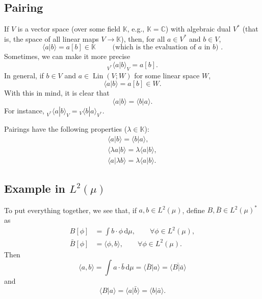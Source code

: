 \documentclass[a4paper,9pt]{amsart}
\newcommand{\bb}[1]{\mathbb{#1}}
\newcommand{\C}{\mathbb{C}}	%
\newcommand{\did}{\,\mathrm{d}}	%
\theoremstyle{plain}
\theoremstyle{definition}
\theoremstyle{remark}
\begin{document}
\subsection{Pairing}\label{subs6889e83c}
If $V$ is a vector space (over some field $\bb K$, e.g., $\bb K=\C$) with algebraic dual $V^*$ (that is, the space of all linear maps $V\to\bb K$), then,
for all $a\in V^*$ and $b\in V$,
\begin{equation}
	\langle a|b \rangle = a[b] \in \bb K \qquad\text{ (which is the evaluation of $a$ in $b$) .}
\end{equation}
Sometimes, we can make it more precise
\begin{equation}
	{}_{V^*}\langle a|b \rangle_V = a[b] .
\end{equation}
In general, if $b\in V$ and $a\in\operatorname{Lin}(V;W)$ for some linear space $W$,
\begin{equation}
	\langle a|b \rangle = a[b] \in W .
\end{equation}
With this in mind, it is clear that
\begin{equation}
	\langle a|b \rangle = \langle b|a \rangle .
\end{equation}
For instance,
${}_{V^*}\langle a|b \rangle_V = {}_{V}\langle b|a \rangle_{V^*}$.

Pairings have the following properties ($\lambda\in\bb K$):
\begin{align}
	\langle a|b \rangle = \langle b|a \rangle , \\
	\langle \lambda a|b \rangle = \lambda \langle a|b \rangle , \\
	\langle a|\lambda b \rangle = \lambda \langle a|b \rangle .
\end{align}

\subsection{Example in $L^2(\mu)$}
To put everything together, we see that, if $a,b\in L^2(\mu)$, define $B,\bar B\in L^2(\mu)^*$ as 
\begin{align}
	B[\phi] &= \int b\cdot\phi\did \mu,
	\qquad\forall \phi\in L^2(\mu)  ,\\
	\bar B[\phi] &= \langle \phi,b \rangle,
	\qquad\forall \phi\in L^2(\mu) .
\end{align}
Then
\begin{equation}
	\langle a,b \rangle 
	= \int a\cdot \bar b \did\mu 
	= \langle \bar B|a \rangle
	= \overline{\langle B|\bar a \rangle}
\end{equation}
and
\begin{equation}
	\langle B|a \rangle
	= \langle a|\bar b \rangle 
	= \langle b|\bar a \rangle .
\end{equation}
\end{document}
